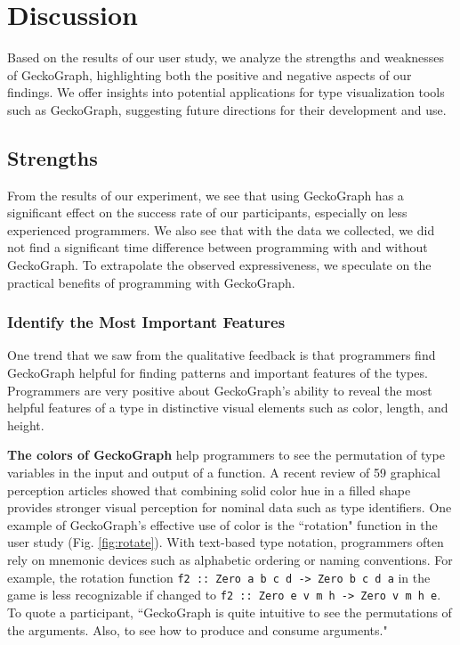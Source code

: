 \section{Discussion} 
Based on the results of our user study, we analyze the strengths and weaknesses of GeckoGraph, highlighting both the positive and negative aspects of our findings. We offer insights into potential applications for type visualization tools such as GeckoGraph, suggesting future directions for their development and use.


\label{sec:gecko-discussion}
\subsection{Strengths}
From the results of our experiment, we see that using GeckoGraph has a significant effect on the success rate of our participants, especially on less experienced programmers. We also see that with the data we collected, we did not find a significant time difference between programming with and without GeckoGraph. To extrapolate the observed expressiveness, we speculate on the practical benefits of programming with GeckoGraph.

\subsubsection{Identify the Most Important Features}
One trend that we saw from the qualitative feedback is that programmers find GeckoGraph helpful for finding patterns and important features of the types. Programmers are very positive about GeckoGraph's ability to reveal the most helpful features of a type in distinctive visual elements such as color, length, and height.

\textbf{The colors of GeckoGraph} help programmers to see the permutation of type variables in the input and output of a function. A recent review \cite{Zeng2023-jz} of 59 graphical perception articles showed that combining solid color hue in a filled shape provides stronger visual perception for nominal data such as type identifiers. One example of GeckoGraph's effective use of color is the ``rotation" function in the user study (Fig. \ref{fig:rotate}). With text-based type notation, programmers often rely on mnemonic devices such as alphabetic ordering or naming conventions. For example, the rotation function \texttt{f2 :: Zero a b c d -> Zero b c d a} in the game is less recognizable if changed to \texttt{f2 :: Zero e v m h -> Zero v m h e}. To quote a participant, ``GeckoGraph is quite intuitive to see the permutations of the arguments. Also, to see how to produce and consume arguments." 

